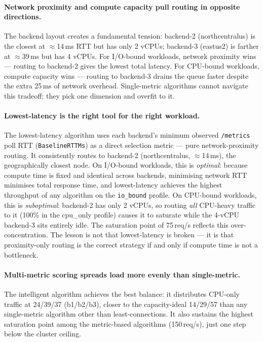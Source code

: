 \documentclass[12pt]{article}
\begin{document}
\paragraph{Network proximity and compute capacity pull routing in opposite directions.}
The backend layout creates a fundamental tension: backend-2 (northcentralus)
is the closest at $\approx$14\,ms RTT but has only 2 vCPUs; backend-3
(eastus2) is farther at $\approx$39\,ms but has 4 vCPUs. For I/O-bound
workloads, network proximity wins --- routing to backend-2 gives the lowest
total latency. For CPU-bound workloads, compute capacity wins --- routing to
backend-3 drains the queue faster despite the extra 25\,ms of network
overhead. Single-metric algorithms cannot navigate this tradeoff; they pick
one dimension and overfit to it.

\paragraph{Lowest-latency is the right tool for the right workload.}
The lowest-latency algorithm uses each backend's minimum observed
\texttt{/metrics} poll RTT (\texttt{BaselineRTTMs}) as a direct selection
metric --- pure network-proximity routing. It consistently routes to
backend-2 (northcentralus, $\approx$14\,ms), the geographically closest
node. On I/O-bound workloads, this is \emph{optimal}: because compute time
is fixed and identical across backends, minimising network RTT minimises
total response time, and lowest-latency achieves the highest throughput
of any algorithm on the \texttt{io\_bound} profile. On CPU-bound workloads,
this is \emph{suboptimal}: backend-2 has only 2 vCPUs, so routing
\emph{all} CPU-heavy traffic to it (100\% in the cpu\_only profile) causes it
to saturate while the 4-vCPU backend-3 sits entirely idle. The saturation
point of 75\,req/s reflects this over-concentration. The lesson is not that lowest-latency is broken ---
it is that proximity-only routing is the correct strategy if and only if
compute time is not a bottleneck.

\paragraph{Multi-metric scoring spreads load more evenly than single-metric.}
The intelligent algorithm achieves the best balance: it distributes CPU-only
traffic at 24/39/37 (b1/b2/b3), closer to the capacity-ideal 14/29/57 than
any single-metric algorithm other than least-connections. It also sustains the
highest saturation point among the metric-based algorithms (150\,req/s), just
one step below the cluster ceiling.
\end{document}

